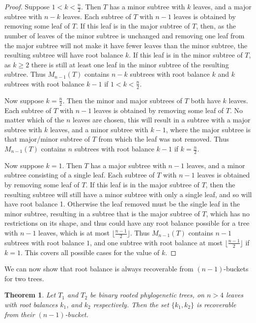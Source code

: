 \documentclass[12pt]{article}
\newtheorem{Theorem}{Theorem}[section]
\theoremstyle{definition}
\begin{document}
\begin{proof}
    Suppose $1<k<\frac{n}{2}$. Then $T$ has a minor subtree with $k$ leaves, and a major subtree with $n-k$ leaves. Each subtree of $T$ with $n-1$ leaves is obtained by removing some leaf of $T$. If this leaf is in the major subtree of $T$, then, as the number of leaves of the minor subtree is unchanged and removing one leaf from the major subtree will not make it have fewer leaves than the minor subtree, the resulting subtree will have root balance $k$. If this leaf is in the minor subtree of $T$, as $k \geq 2$ there is still at least one leaf in the minor subtree of the resulting subtree. Thus $M_{n-1}(T)$ contains $n-k$ subtrees with root balance $k$ and $k$ subtrees with root balance $k-1$ if $1<k<\frac{n}{2}$.
    
    Now suppose $k = \frac{n}{2}$. Then the minor and major subtrees of $T$ both have $k$ leaves. Each subtree of $T$ with $n-1$ leaves is obtained by removing some leaf of $T$. No matter which of the $n$ leaves are chosen, this will result in a subtree with a major subtree with $k$ leaves, and a minor subtree with $k-1$, where the major subtree is that major/minor subtree of $T$ from which the leaf was not removed. Thus $M_{n-1}(T)$ contains $n$ subtrees with root balance $k-1$ if $k=\frac{n}{2}$.
    
    Now suppose $k=1$. Then $T$ has a major subtree with $n-1$ leaves, and a minor subtree consisting of a single leaf. Each subtree of $T$ with $n-1$ leaves is obtained by removing some leaf of $T$. If this leaf is in the major subtree of $T$, then the resulting subtree will still have a minor subtree with only a single leaf, and so will have root balance 1. Otherwise the leaf removed must be the single leaf in the minor subtree, resulting in a subtree that is the major subtree of $T$, which has no restrictions on its shape, and thus could have any root balance possible for a tree with $n-1$ leaves, which is at most $\lfloor\frac{n-1}{2}\rfloor$. Thus $M_{n-1}(T)$ contains $n-1$ subtrees with root balance $1$, and one subtree with root balance at most $\lfloor\frac{n-1}{2}\rfloor$ if $k=1$.
    This covers all possible cases for the value of $k$.
\end{proof}

We can now show that root balance is always recoverable from $(n-1)$-buckets for two trees.

\begin{Theorem}\label{unlabelled_buckets_rb_equal}
    Let $T_1$ and $T_2$ be binary rooted phylogenetic trees, on $n>4$ leaves with root balances $k_1$, and $k_2$ respectively. Then the set $\{k_1, k_2\}$ is recoverable from their $(n-1)$-bucket.
\end{Theorem}
\end{document}
